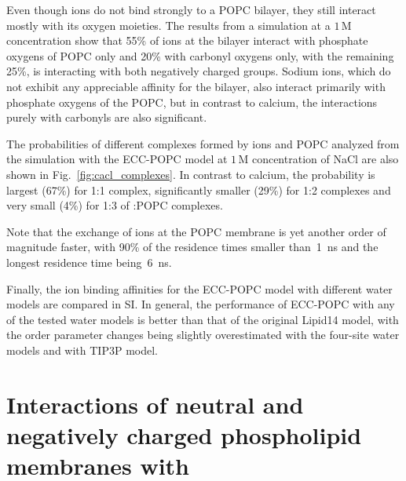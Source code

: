 Even though  ions do not bind strongly to a POPC bilayer, they still interact mostly with its oxygen moieties. 
The results from a simulation at a $1\,$M  concentration show that 55\% of  ions at the bilayer interact with phosphate oxygens of POPC only and 20\% with carbonyl oxygens only, with the remaining 25\%, is interacting with both negatively charged groups. 
Sodium ions, which do not exhibit any appreciable affinity for the bilayer, also interact primarily with phosphate oxygens of the POPC, but in contrast to calcium, the interactions purely with carbonyls are also significant. 
 
The probabilities of different complexes formed by  ions and POPC 
analyzed from the simulation with the ECC-POPC model at $1\,$M concentration of NaCl are also  
shown in Fig.~\ref{fig:cacl_complexes}. In contrast to calcium, the 
probability is largest (67\%) for 1:1 complex, significantly smaller (29\%) 
for 1:2 complexes and very small (4\%) for 1:3 of :POPC complexes. 
 
Note that the exchange of  ions at the POPC membrane 
is yet another order of magnitude faster, with 90\% of the residence times smaller than~1~ns and the longest residence time being~6~ns. 
 
Finally, the ion binding affinities for the ECC-POPC model with different water models are compared in SI. In general, the performance of ECC-POPC with any of the tested water models is better than that of the original Lipid14 model, with the order parameter changes being slightly overestimated with the four-site water models and with TIP3P model. 
 





 
 


\section{Interactions of neutral and negatively charged phospholipid membranes with }




